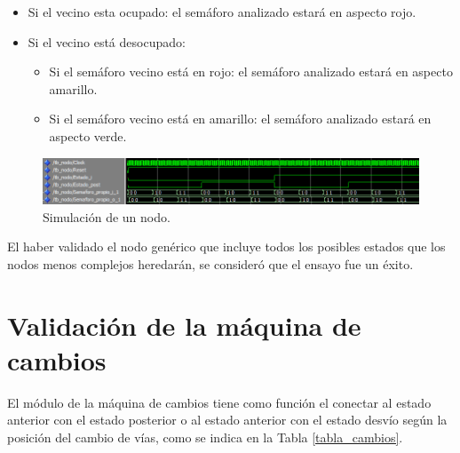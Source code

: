 			\begin{itemize}
				\item Si el vecino esta ocupado: el semáforo analizado estará en aspecto rojo.
				\item Si el vecino está desocupado:
				\begin{itemize}
					\item Si el semáforo vecino está en rojo: el semáforo analizado estará en aspecto amarillo.
					\item Si el semáforo vecino está en amarillo:  el semáforo analizado estará en aspecto verde.
				\end{itemize}				 
			\end{itemize}
			
			\begin{figure}[h]
			\centering
			\includegraphics[scale=0.6]{./Figures/Test/Nodo}
				\caption{Simulación de un nodo.}
				\label{fig:Test_Nodo}
			\end{figure}
				
			El haber validado el nodo genérico que incluye todos los posibles estados que los nodos menos complejos heredarán, se consideró que el ensayo fue un éxito.			
	
\section{Validación de la máquina de cambios}

	El módulo de la máquina de cambios tiene como función el conectar al estado anterior con el estado posterior o al estado anterior con el estado desvío según la posición del cambio de vías, como se indica en la Tabla \ref{tabla_cambios}.
	
